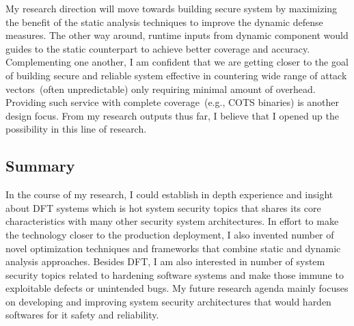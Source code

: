 \documentclass[letterpaper, 10pt]{article}
\begin{document}
\begin{small}
My research direction will move towards building secure system by  maximizing
the benefit of the static analysis techniques to improve the dynamic defense
measures. 
%
The other way around, runtime inputs from dynamic component would guides to the
static counterpart to achieve better coverage and accuracy.
%
Complementing one another, I am confident that we are getting closer to the
goal of building secure and reliable system effective in countering wide range
of attack vectors~(often unpredictable) only requiring minimal amount of
overhead. Providing such service with complete coverage~(e.g., COTS binaries)
is another design focus.
%
From my research outputs thus far, I believe that I opened up the possibility
in this line of research.

\subsection*{Summary}
In the course of my research, I could establish in depth experience and insight
about DFT systems which is hot system security topics that shares its core
characteristics with many other security system architectures.
%
In effort to make the technology closer to the production deployment, I also
invented number of novel optimization techniques and frameworks that combine
static and dynamic analysis approaches.
%
Besides DFT, I am also interested in number of system security topics related
to hardening software systems and make those immune to exploitable defects or
unintended bugs. 
%
My future research agenda mainly focuses on developing and improving system
security architectures that would harden softwares for it safety and
reliability. 
%
\end{small} 

\newpage



\end{document}
